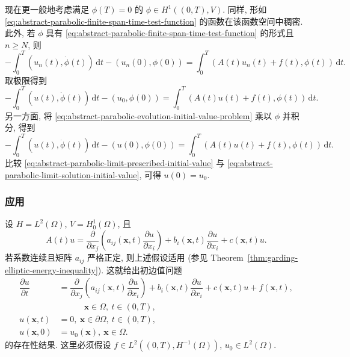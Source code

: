 现在更一般地考虑满足 $\phi(T)=0$ 的 $\phi\in H^1((0,T),V)$. 同样, 形如 \eqref{eq:abstract-parabolic-finite-span-time-test-function} 的函数在该函数空间中稠密. 此外, 若 $\phi$ 具有 \eqref{eq:abstract-parabolic-finite-span-time-test-function} 的形式且 $n\geq N$, 则
\begin{equation}\label{eq:abstract-parabolic-galerkin-initial-trace-identity}
-\int_0^T(u_n(t),\dot\phi(t))\,\mathrm{d}t-(u_n(0),\phi(0))=\int_0^T(A(t)u_n(t)+f(t),\phi(t))\,\mathrm{d}t.
\end{equation}
取极限得到
\begin{equation}\label{eq:abstract-parabolic-limit-prescribed-initial-value}
-\int_0^T(u(t),\dot\phi(t))\,\mathrm{d}t-(u_0,\phi(0))=\int_0^T(A(t)u(t)+f(t),\phi(t))\,\mathrm{d}t.
\end{equation}
另一方面, 将 \eqref{eq:abstract-parabolic-evolution-initial-value-problem} 乘以 $\phi$ 并积分, 得到
\begin{equation}\label{eq:abstract-parabolic-limit-solution-initial-value}
-\int_0^T(u(t),\dot\phi(t))\,\mathrm{d}t-(u(0),\phi(0))=\int_0^T(A(t)u(t)+f(t),\phi(t))\,\mathrm{d}t.
\end{equation}
比较 \eqref{eq:abstract-parabolic-limit-prescribed-initial-value} 与 \eqref{eq:abstract-parabolic-limit-solution-initial-value}, 可得 $u(0)=u_0$.

\subsubsection{应用}\label{subsec:parabolic-pde-applications}

\begin{Example}
\label{ex:parabolic-divergence-dirichlet-problem}
设 $H=L^2(\Omega)$, $V=H_0^1(\Omega)$, 且
\begin{equation}\label{eq:parabolic-dirichlet-spatial-divergence-operator}
A(t)u=\dfrac{\partial}{\partial x_j}\left(a_{ij}(\bm{x},t)\dfrac{\partial u}{\partial x_i}\right)+b_i(\bm{x},t)\dfrac{\partial u}{\partial x_i}+c(\bm{x},t)u.
\end{equation}
若系数连续且矩阵 $a_{ij}$ 严格正定, 则上述假设适用 (参见 Theorem~\ref{thm:garding-elliptic-energy-inequality}). 这就给出初边值问题
\begin{equation}\label{eq:parabolic-dirichlet-initial-boundary-value-problem}
\begin{aligned}
\dfrac{\partial u}{\partial t}&=\dfrac{\partial}{\partial x_j}\left(a_{ij}(\bm{x},t)\dfrac{\partial u}{\partial x_i}\right)+b_i(\bm{x},t)\dfrac{\partial u}{\partial x_i}+c(\bm{x},t)u+f(\bm{x},t),\\
&\hspace{3em}\bm{x}\in\Omega,\ t\in(0,T),\\
u(\bm{x},t)&=0,\ \bm{x}\in\partial\Omega,\ t\in(0,T),\\
u(\bm{x},0)&=u_0(\bm{x}),\ \bm{x}\in\Omega.
\end{aligned}
\end{equation}
的存在性结果. 这里必须假设 $f\in L^2((0,T),H^{-1}(\Omega))$, $u_0\in L^2(\Omega)$.
\end{Example}

